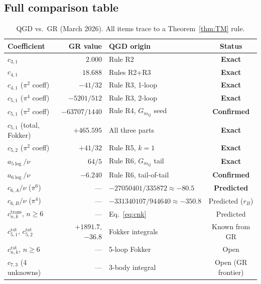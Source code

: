 \documentclass[11pt,a4paper]{article}
\theoremstyle{plain}
\theoremstyle{definition}
\theoremstyle{remark}
\newcommand{\mQ}{m_Q}
\begin{document}
\subsection{Full comparison table}

\begin{table}[h]
\centering
\renewcommand{\arraystretch}{1.3}
\caption{QGD vs.\ GR (March 2026). All items trace to a Theorem~\ref{thm:TM} rule.}
\label{tab:compare}
\begin{tabular}{@{}p{5cm}rp{3.5cm}c@{}}
\toprule
Coefficient & GR value & QGD origin & Status \\
\midrule
$c_{3,1}$ & $2.000$ & Rule R2 & \textcolor{confirmed}{\textbf{Exact}} \\
$c_{4,1}$ & $18.688$ & Rules R2+R3 & \textcolor{confirmed}{\textbf{Exact}} \\
$c_{4,1}$ ($\pi^2$ coeff) & $-41/32$ & Rule R3, 1-loop & \textcolor{confirmed}{\textbf{Exact}} \\
$c_{5,1}$ ($\pi^4$ coeff) & $-5201/512$ & Rule R3, 2-loop & \textcolor{confirmed}{\textbf{Exact}} \\
$c_{5,1}$ ($\pi^2$ coeff) & $-63707/1440$ & Rule R4, $G_{\mQ}$ seed & \textcolor{confirmed}{\textbf{Confirmed}} \\
$c_{5,1}$ (total, Fokker) & $+465.595$ & All three parts & \textcolor{confirmed}{\textbf{Exact}} \\
$c_{5,2}$ ($\pi^2$ coeff) & $+41/32$ & Rule R5, $k=1$ & \textcolor{confirmed}{\textbf{Exact}} \\
$a_{5\log}/\nu$ & $64/5$ & Rule R6, $G_{\mQ}$ tail & \textcolor{confirmed}{\textbf{Exact}} \\
$a_{6\log}/\nu$ & $-6.240$ & Rule R6, tail-of-tail & \textcolor{confirmed}{\textbf{Confirmed}} \\
\midrule
$c_{6,A}/\nu$ ($\pi^6$) & --- & $-27050401/335872\approx-80.5$ & \textcolor{predicted}{\textbf{Predicted}} \\
$c_{6,B}/\nu$ ($\pi^4$) & --- & $-331340107/944640\approx-350.8$ & \textcolor{predicted}{Predicted ($r_B$)} \\
$c_{n,k}^{\mathrm{trans}}$, $n\geq6$ & --- & Eq.~\eqref{eq:cnk} & \textcolor{predicted}{Predicted} \\
\midrule
$c_{5,1}^{\mathrm{rat}}$, $c_{5,2}^{\mathrm{rat}}$ & $+1891.7$, $-36.8$ & Fokker integrals & \textcolor{open}{Known from GR} \\
$c_{n,k}^{\mathrm{rat}}$, $n\geq6$ & --- & 5-loop Fokker & \textcolor{open}{Open} \\
$c_{7,3}$ (4 unknowns) & --- & 3-body integral & \textcolor{open}{Open (GR frontier)} \\
\bottomrule
\end{tabular}
\end{table}
\end{document}
